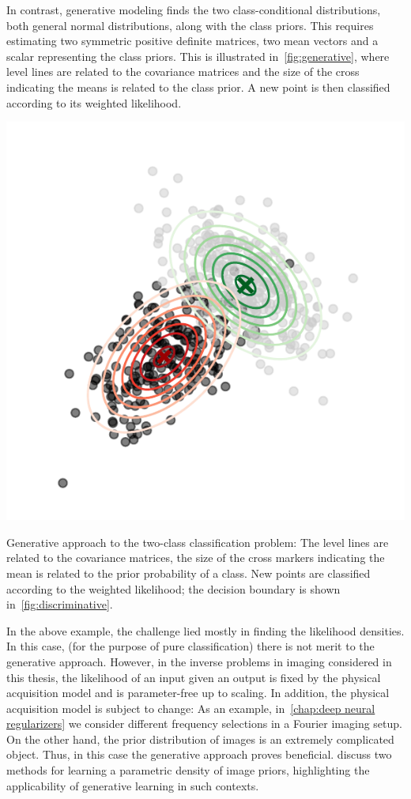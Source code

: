 In contrast, generative modeling finds the two class-conditional distributions, both general normal distributions, along with the class priors.
This requires estimating two symmetric positive definite matrices, two mean vectors and a scalar representing the class priors.
This is illustrated in~\cref{fig:generative}, where level lines are related to the covariance matrices and the size of the cross indicating the means is related to the class prior.
A new point is then classified according to its weighted likelihood.
\begin{sidefigure}
	\includegraphics[width=\marginparwidth]{learning-types/generative}
	\caption[Generative two-class classification]{
		Generative approach to the two-class classification problem:
		The level lines are related to the covariance matrices, the size of the cross markers indicating the mean is related to the prior probability of a class.
		New points are classified according to the weighted likelihood; the decision boundary is shown in~\cref{fig:discriminative}.
	}%
	\label{fig:generative}
\end{sidefigure}

In the above example, the challenge lied mostly in finding the likelihood densities.
In this case, (for the purpose of pure classification) there is not merit to the generative approach.
However, in the inverse problems in imaging considered in this thesis, the likelihood of an input given an output is fixed by the physical acquisition model and is parameter-free up to scaling.
In addition, the physical acquisition model is subject to change:
As an example, in~\cref{chap:deep neural regularizers} we consider different frequency selections in a Fourier imaging setup.
On the other hand, the prior distribution of images is an extremely complicated object.
Thus, in this case the generative approach proves beneficial.
 discuss two methods for learning a parametric density of image priors, highlighting the applicability of generative learning in such contexts.
